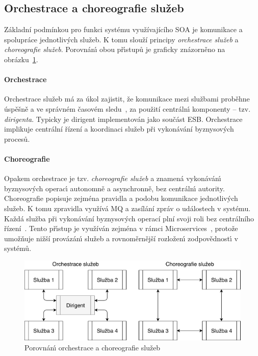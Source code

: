 \subsection{Orchestrace a choreografie služeb}\label{sec:orchestration-vs-choreography}

Základní podmínkou pro funkci systému využívajícího \gls{SOA} je komunikace a spolupráce jednotlivých služeb.
K tomu slouží principy \textit{orchestrace služeb} a \textit{choreografie služeb}. Porovnán\'{\i} obou př\'{\i}stupů
je graficky znázorněno na obrázku~\ref{fig:choreography-orchestration}.

\paragraph{Orchestrace}
Orchestrace služeb má za úkol zajistit, že komunikace mezi službami
proběhne úspěšně a ve správném časovém sledu~\cite{orchestration},
za použití centráln\'{\i} komponenty -- tzv. \textit{dirigenta}.
Typicky je dirigent implementován jako součást \gls{ESB}.
Orchestrace implikuje centrální řízení a koordinaci služeb při
vykonávání byznysových procesů.

\paragraph{Choreografie}
Opakem orchestrace je tzv. \textit{choreografie služeb} a znamená
vykonáván\'{\i} byznysov\'ych operac\'{\i} autonomně a asynchronně, bez centráln\'{\i}
autority. Choreografie popisuje zejména pravidla a podobu komunikace jednotlivých služeb.
K tomu zpravidla využívá \gls{MQ} a zasílání zpráv o událostech v systému. Každá služba
při vykonávání byznysových operací plní svoji roli bez centrálního řízení~\cite{cerny2017disambiguation}.
Tento př\'{\i}stup je využíván zejména v rámci Microservices~\cite{dragoni2017microservices},
protože umožňuje nižší provázán\'{\i} služeb a rovnoměrnější rozložen\'{\i} zodpovědnost\'{\i} v systémů.

\begin{figure}
    \centering
    \includegraphics[keepaspectratio=true, width=0.7\linewidth]{figures/choreography-orchestration.pdf}
    \caption{Porovnán\'{\i} orchestrace a choreografie služeb}
    \label{fig:choreography-orchestration}
\end{figure}

